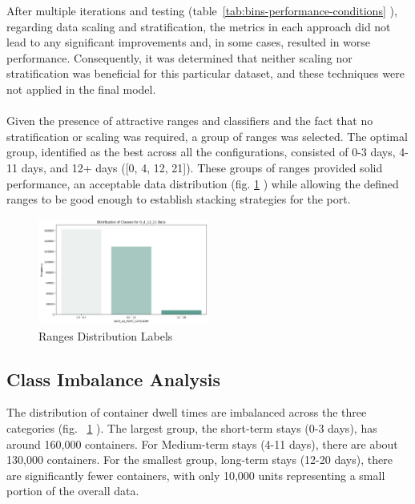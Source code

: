 			After multiple iterations and testing (table~\ref{tab:bins-performance-conditions}
			), regarding data scaling and stratification, the metrics in each approach did not lead to any significant
			improvements and, in some cases, resulted in worse performance. Consequently, it was determined that
			neither scaling nor stratification was beneficial for this particular dataset, and these techniques
			were not applied in the final model.
			\\
			\\
			Given the presence of attractive ranges and classifiers and the fact that no stratification or scaling was
			required, a group of ranges was selected. The optimal group, identified as the best across all the
			configurations, consisted of 0-3 days, 4-11 days, and 12+ days ([0, 4, 12, 21]). These groups of ranges
			provided solid performance, an acceptable data distribution (fig. \ref{fig:class_ranges_distribution}
			) while allowing the defined ranges to be good enough to establish stacking strategies for the
			port.

			\begin{figure}[ht]
				\centering
				\includegraphics[width=0.5\textwidth]{images/ClassRangesDistribution}
				\caption{Ranges Distribution Labels}
				\label{fig:class_ranges_distribution}
			\end{figure}

		\subsection{Class Imbalance Analysis}

			The distribution of container dwell times are imbalanced across the three categories (fig.~
			\ref{fig:class_ranges_distribution}
			). The largest group, the short-term stays (0-3 days), has around 160,000 containers. For
			Medium-term stays (4-11 days), there are about 130,000 containers. For the smallest group, long-term
			stays (12-20 days), there are significantly fewer containers, with only 10,000 units representing a small
			portion of the overall data.

